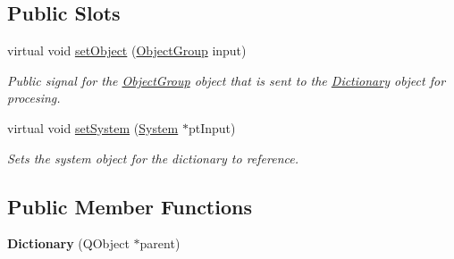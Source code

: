\subsection*{Public Slots}
\begin{DoxyCompactItemize}
\item 
virtual void \hyperlink{class_dictionary_a900221a385d133644aedcadbae90c2be}{set\-Object} (\hyperlink{class_object_group}{Object\-Group} input)
\begin{DoxyCompactList}\small\item\em Public signal for the \hyperlink{class_object_group}{Object\-Group} object that is sent to the \hyperlink{class_dictionary}{Dictionary} object for procesing. \end{DoxyCompactList}\item 
virtual void \hyperlink{class_dictionary_a5fc7a78aa9aeb0c22ab5de54c7f7790f}{set\-System} (\hyperlink{class_system}{System} $\ast$pt\-Input)
\begin{DoxyCompactList}\small\item\em Sets the system object for the dictionary to reference. \end{DoxyCompactList}\end{DoxyCompactItemize}
\subsection*{Public Member Functions}
\begin{DoxyCompactItemize}
\item 
\hypertarget{class_dictionary_a6ff9dd5005c8796e0cc13a8bc4cb2288}{{\bfseries Dictionary} (Q\-Object $\ast$parent)}\label{class_dictionary_a6ff9dd5005c8796e0cc13a8bc4cb2288}

\end{DoxyCompactItemize}

